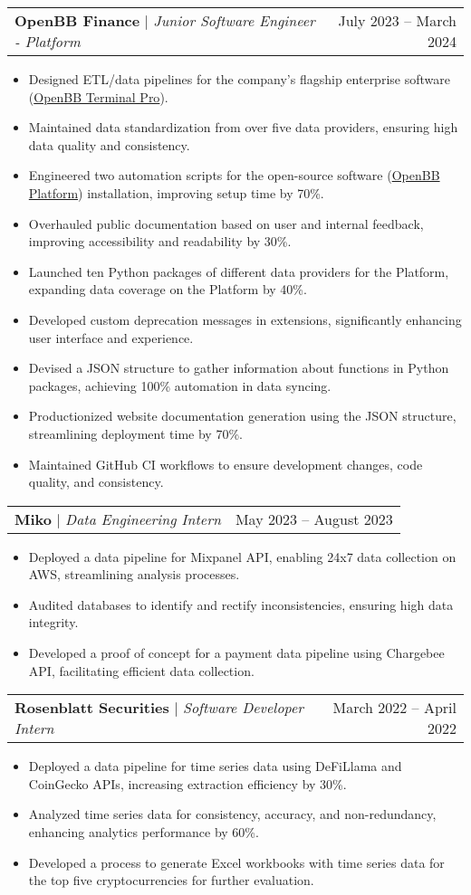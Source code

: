 \documentclass[letterpaper,11pt]{article}
\makeatletter
\newcommand{\resumeItem}[1]{
  \item\small{
    {#1 \vspace{-2pt}}
  }
}
\newcommand{\resumeProjectHeading}[2]{
    \item
    \begin{tabular*}{0.97\textwidth}{l@{\extracolsep{\fill}}r}
      \small#1 & #2 \\
    \end{tabular*}\vspace{-7pt}
}
\newcommand{\resumeItemListStart}{\begin{itemize}}
\newcommand{\resumeItemListEnd}{\end{itemize}\vspace{-5pt}}
\makeatother
\begin{document}
    \resumeProjectHeading
    {\textbf{OpenBB Finance} $|$ \footnotesize\emph{Junior Software Engineer - Platform}}{July 2023 -- March 2024}
    \resumeItemListStart
      \resumeItem{Designed ETL/data pipelines for the company's flagship enterprise software (\href{https://openbb.co/products/pro}{OpenBB Terminal Pro}).}
      \resumeItem{Maintained data standardization from over five data providers, ensuring high data quality and consistency.}
      \resumeItem{Engineered two automation scripts for the open-source software (\href{https://github.com/OpenBB-finance/OpenBB}{OpenBB Platform}) installation, improving setup time by 70\%.}
      \resumeItem{Overhauled public documentation based on user and internal feedback, improving accessibility and readability by 30\%.}
      \resumeItem{Launched ten Python packages of different data providers for the Platform, expanding data coverage on the Platform by 40\%.}
      \resumeItem{Developed custom deprecation messages in extensions, significantly enhancing user interface and experience.}
      \resumeItem{Devised a JSON structure to gather information about functions in Python packages, achieving 100\% automation in data syncing.}
      \resumeItem{Productionized website documentation generation using the JSON structure, streamlining deployment time by 70\%.}
      \resumeItem{Maintained GitHub CI workflows to ensure development changes, code quality, and consistency.}
    \resumeItemListEnd

    \resumeProjectHeading
    {\textbf{Miko} $|$ \footnotesize\emph{Data Engineering Intern}}{May 2023 -- August 2023}
    \resumeItemListStart
      \resumeItem{Deployed a data pipeline for Mixpanel API, enabling 24x7 data collection on AWS, streamlining analysis processes.}
      \resumeItem{Audited databases to identify and rectify inconsistencies, ensuring high data integrity.}
      \resumeItem{Developed a proof of concept for a payment data pipeline using Chargebee API, facilitating efficient data collection.}
    \resumeItemListEnd

    \resumeProjectHeading
    {\textbf{Rosenblatt Securities} $|$ \footnotesize\emph{Software Developer Intern}}{March 2022 -- April 2022}
    \resumeItemListStart
      \resumeItem{Deployed a data pipeline for time series data using DeFiLlama and CoinGecko APIs, increasing extraction efficiency by 30\%.}
      \resumeItem{Analyzed time series data for consistency, accuracy, and non-redundancy, enhancing analytics performance by 60\%.}
      \resumeItem{Developed a process to generate Excel workbooks with time series data for the top five cryptocurrencies for further evaluation.}
    \resumeItemListEnd
\end{document}
